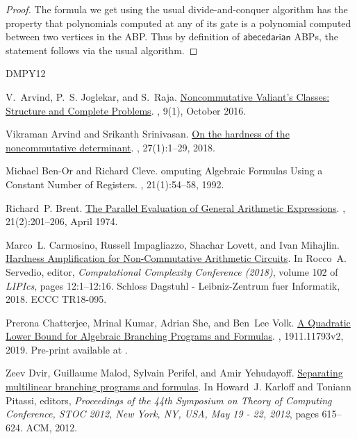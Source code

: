 \documentclass[10pt,a4paper]{article}
\newcommand{\abcd}{\mathsf{abecedarian}}
\begin{document}
\ABPtoForm*

\begin{proof}
	The formula we get using the usual divide-and-conquer algorithm has the property that polynomials computed at any of its gate is a polynomial computed between two vertices in the ABP.
	Thus by definition of $\abcd$ ABPs, the statement follows via the usual algorithm.
\end{proof}

\begin{thebibliography}{DMPY12}

V.~Arvind, P.~S. Joglekar, and S.~Raja.
\newblock \href {http://dx.doi.org/10.1145/2956230} {Noncommutative Valiant's
  Classes: Structure and Complete Problems}.
, 9(1), October 2016.

Vikraman Arvind and Srikanth Srinivasan.
\newblock \href {http://dx.doi.org/10.1007/s00037-016-0148-5} {On the hardness
  of the noncommutative determinant}.
, 27(1):1--29, 2018.

Michael {Ben-Or} and Richard Cleve.
omputing {A}lgebraic {F}ormulas {U}sing a {C}onstant {N}umber of
  {R}egisters.
, 21(1):54--58, 1992.

Richard~P. Brent.
\newblock \href {http://dx.doi.org/10.1145/321812.321815} {The Parallel
  Evaluation of General Arithmetic Expressions}.
, 21(2):201--206, April 1974.

Marco~L. Carmosino, Russell Impagliazzo, Shachar Lovett, and Ivan Mihajlin.
\newblock \href {http://dx.doi.org/10.4230/LIPIcs.CCC.2018.12} {Hardness
  Amplification for Non-Commutative Arithmetic Circuits}.
\newblock In Rocco~A. Servedio, editor, {\em Computational Complexity Conference (2018)}, volume 102 of {\em
  LIPIcs}, pages 12:1--12:16. Schloss Dagstuhl - Leibniz-Zentrum fuer
  Informatik, 2018.
\newblock ECCC TR18-095.

Prerona Chatterjee, Mrinal Kumar, Adrian She, and Ben~Lee Volk.
\newblock \href {http://arxiv.org/abs/1911.11793v2} {A Quadratic Lower Bound
  for Algebraic Branching Programs and Formulas}.
, 1911.11793v2, 2019.
\newblock Pre-print available at \href {http://arxiv.org/abs/1911.11793v2}
  {}.

Zeev Dvir, Guillaume Malod, Sylvain Perifel, and Amir Yehudayoff.
\newblock \href {http://dx.doi.org/10.1145/2213977.2214034} {Separating
  multilinear branching programs and formulas}.
\newblock In Howard~J. Karloff and Toniann Pitassi, editors, {\em Proceedings
  of the 44th Symposium on Theory of Computing Conference, {STOC} 2012, New
  York, NY, USA, May 19 - 22, 2012}, pages 615--624. {ACM}, 2012.


\end{thebibliography}
\end{document}
